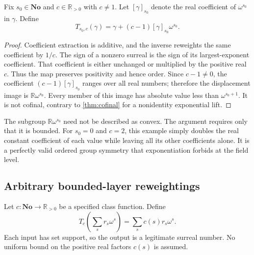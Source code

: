 \documentclass[11pt]{article}
\newtheorem{proposition}[theorem]{Proposition}
\theoremstyle{definition}
\theoremstyle{remark}
\newcommand{\No}{\mathbf{No}}
\newcommand{\R}{\mathbb{R}}
\numberwithin{equation}{section}
\begin{document}
Fix $s_0\in\No$ and $c\in\R_{>0}$ with $c\ne1$. Let
$[\gamma]_{s_0}$ denote the real coefficient of $\omega^{s_0}$ in $\gamma$.
Define
\begin{equation}\label{eq:single-layer}
 T_{s_0,c}(\gamma)
  =\gamma+(c-1)[\gamma]_{s_0}\omega^{s_0}.
\end{equation}

\begin{proof}
Coefficient extraction is additive, and the inverse reweights the same
coefficient by $1/c$. The sign of a nonzero surreal is the sign of its
largest-exponent coefficient. That coefficient is either unchanged or
multiplied by the positive real $c$. Thus the map preserves positivity
and hence order.
Since $c-1\ne0$, the coefficient $(c-1)[\gamma]_{s_0}$ ranges over all
real numbers; therefore the displacement image is $\R\omega^{s_0}$.
Every member of this image has absolute value less than
$\omega^{s_0+1}$. It is not cofinal, contrary to \cref{thm:cofinal} for a
nonidentity exponential lift.
\end{proof}

The subgroup $\R\omega^{s_0}$ need not be described as convex. The
argument requires only that it is bounded. For $s_0=0$ and $c=2$, this
example simply doubles the real constant coefficient of each value while
leaving all its other coefficients alone. It is a perfectly valid ordered
group symmetry that exponentiation forbids at the field level.

\subsection{Arbitrary bounded-layer reweightings}

Let $c:\No\to\R_{>0}$ be a specified class function. Define
\begin{equation}\label{eq:weighted}
 T_c\left(\sum_s r_s\omega^s\right)
      =\sum_s c(s)r_s\omega^s.
\end{equation}
Each input has set support, so the output is a legitimate surreal number.
No uniform bound on the positive real factors $c(s)$ is assumed.
\end{document}
